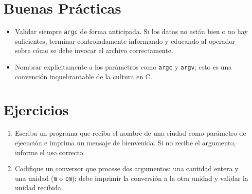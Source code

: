 \documentclass[12pt,a4paper]{article}
\begin{document}
\section{Buenas Prácticas}
\begin{itemize}
    \item Validar siempre \texttt{argc} de forma anticipada. Si los datos no están bien o no hay suficientes, terminar controladamente informando y educando al operador sobre cómo se debe invocar el archivo correctamente.
    \item Nombrar explícitamente a los parámetros como \texttt{argc} y \texttt{argv}; esto es una convención inquebrantable de la cultura en C.
\end{itemize}

\section{Ejercicios}
\begin{enumerate}
    \item Escriba un programa que reciba el nombre de una ciudad como parámetro de ejecución e imprima un mensaje de bienvenida. Si no recibe el argumento, informe el uso correcto.
    \item Codifique un conversor que procese dos argumentos: una cantidad entera y una unidad (\texttt{m} o \texttt{cm}); debe imprimir la conversión a la otra unidad y validar la unidad recibida.
\end{enumerate}
\end{document}

